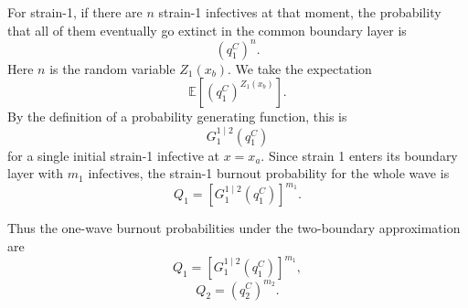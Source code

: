 \documentclass[11pt]{article}
\begin{document}
For strain-1, if there are \(n\) strain-1 infectives at that moment, the probability that all of them eventually go extinct in the common boundary layer is
\[
(q_1^C)^n.
\]
Here \(n\) is the random variable \(Z_1(x_b)\).  We take the expectation
\[
\mathbb E[(q_1^C)^{Z_1(x_b)}].
\]
By the definition of a probability generating function, this is
\[
G_1^{1\mid 2}(q_1^C)
\]
for a single initial strain-1 infective at \(x=x_a\). Since strain 1 enters its boundary layer with \(m_1\) infectives, the strain-1 burnout probability for the whole wave is
\[
Q_1
=
\left[G_1^{1\mid 2}(q_1^C)\right]^{m_1}.
\]

Thus the one-wave burnout probabilities under the two-boundary approximation are
\[
Q_1
=
\left[G_1^{1\mid 2}(q_1^C)\right]^{m_1},
\]
\[
Q_2
=
(q_2^C)^{m_2}.
\]
\end{document}

